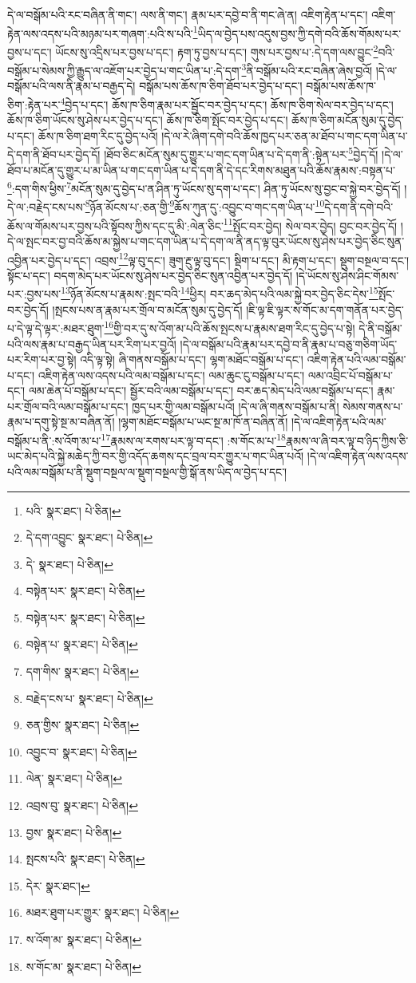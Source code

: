 དེ་ལ་བསྒོམ་པའི་རང་བཞིན་ནི་གང་། ལས་ནི་གང་། རྣམ་པར་དབྱེ་བ་ནི་གང་ཞེ་ན། འཇིག་རྟེན་པ་དང་། འཇིག་རྟེན་ལས་འདས་པའི་མཉམ་པར་གཞག་:པའི་ས་པའི་\footnote{པའི་  སྣར་ཐང་།  པེ་ཅིན། }ཡིད་ལ་བྱེད་པས་འདུས་བྱས་ཀྱི་དགེ་བའི་ཆོས་གོམས་པར་བྱས་པ་དང་། ཡོངས་སུ་འདྲིས་པར་བྱས་པ་དང་། རྟག་ཏུ་བྱས་པ་དང་། གུས་པར་བྱས་པ་:དེ་དག་ལས་བྱུང་\footnote{དེ་དག་འབྱུང་  སྣར་ཐང་།  པེ་ཅིན། }བའི་བསྒོམ་པ་སེམས་ཀྱི་རྒྱུད་ལ་འཇོག་པར་བྱེད་པ་གང་ཡིན་པ་:དེ་དག་\footnote{དེ་  སྣར་ཐང་།  པེ་ཅིན། }ནི་བསྒོམ་པའི་རང་བཞིན་ཞེས་བྱའོ། །དེ་ལ་བསྒོམ་པའི་ལས་ནི་རྣམ་པ་བརྒྱད་དེ། བསྒོམ་པས་ཆོས་ཁ་ཅིག་ཐོབ་པར་བྱེད་པ་དང་། བསྒོམ་པས་ཆོས་ཁ་ཅིག་:རྟེན་པར་\footnote{བསྟེན་པར་  སྣར་ཐང་།  པེ་ཅིན། }བྱེད་པ་དང་། ཆོས་ཁ་ཅིག་རྣམ་པར་སྦྱོང་བར་བྱེད་པ་དང་། ཆོས་ཁ་ཅིག་སེལ་བར་བྱེད་པ་དང་། ཆོས་ཁ་ཅིག་ཡོངས་སུ་ཤེས་པར་བྱེད་པ་དང་། ཆོས་ཁ་ཅིག་སྤོང་བར་བྱེད་པ་དང་། ཆོས་ཁ་ཅིག་མངོན་སུམ་དུ་བྱེད་པ་དང་། ཆོས་ཁ་ཅིག་ཐག་རིང་དུ་བྱེད་པའོ། །དེ་ལ་རེ་ཞིག་དགེ་བའི་ཆོས་ཁྱད་པར་ཅན་མ་ཐོབ་པ་གང་དག་ཡིན་པ་དེ་དག་ནི་ཐོབ་པར་བྱེད་དོ། །ཐོབ་ཅིང་མངོན་སུམ་དུ་གྱུར་པ་གང་དག་ཡིན་པ་དེ་དག་ནི་:སྟེན་པར་\footnote{བསྟེན་པར་  སྣར་ཐང་།  པེ་ཅིན། }བྱེད་དོ། །དེ་ལ་ཐོབ་པ་མངོན་དུ་གྱུར་པ་མ་ཡིན་པ་གང་དག་ཡིན་པ་དེ་དག་ནི་དེ་དང་རིགས་མཐུན་པའི་ཆོས་རྣམས་:བསྟན་པ་\footnote{བསྟེན་པ་  སྣར་ཐང་།  པེ་ཅིན། }:དག་གིས་ཕྱིས་\footnote{དག་གིས་  སྣར་ཐང་།  པེ་ཅིན། }མངོན་སུམ་དུ་བྱེད་པ་ན་ཤིན་ཏུ་ཡོངས་སུ་དག་པ་དང་། ཤིན་ཏུ་ཡོངས་སུ་བྱང་བ་སྐྱེ་བར་བྱེད་དོ། །དེ་ལ་:བརྗེད་ངས་པས་\footnote{བརྗེད་ངས་པ་  སྣར་ཐང་།  པེ་ཅིན། }ཉོན་མོངས་པ་:ཅན་གྱི་\footnote{ཅན་གྱིས་  སྣར་ཐང་།  པེ་ཅིན། }ཆོས་ཀུན་དུ་:འབྱུང་བ་གང་དག་ཡིན་པ་\footnote{འབྱུང་བ་  སྣར་ཐང་།  པེ་ཅིན། }དེ་དག་ནི་དགེ་བའི་ཆོས་ལ་གོམས་པར་བྱས་པའི་སྟོབས་ཀྱིས་དང་དུ་མི་:ལེན་ཅིང་\footnote{ལེན་  སྣར་ཐང་།  པེ་ཅིན། }སྤོང་བར་བྱེད། སེལ་བར་བྱེད། བྱང་བར་བྱེད་དོ། །དེ་ལ་སྤང་བར་བྱ་བའི་ཆོས་མ་སྐྱེས་པ་གང་དག་ཡིན་པ་དེ་དག་ལ་ནི་ནད་ལྟ་བུར་ཡོངས་སུ་ཤེས་པར་བྱེད་ཅིང་སུན་འབྱིན་པར་བྱེད་པ་དང་། འབྲས་\footnote{འབྲས་བུ་  སྣར་ཐང་།  པེ་ཅིན། }ལྟ་བུ་དང་། ཟུག་རྔུ་ལྟ་བུ་དང་། སྡིག་པ་དང་། མི་རྟག་པ་དང་། སྡུག་བསྔལ་བ་དང་། སྟོང་པ་དང་། བདག་མེད་པར་ཡོངས་སུ་ཤེས་པར་བྱེད་ཅིང་སུན་འབྱིན་པར་བྱེད་དོ། །དེ་ཡོངས་སུ་ཤེས་ཤིང་གོམས་པར་:བྱས་པས་\footnote{བྱས་  སྣར་ཐང་།  པེ་ཅིན། }ཉོན་མོངས་པ་རྣམས་:སྤང་བའི་\footnote{སྤངས་པའི་  སྣར་ཐང་།  པེ་ཅིན། }ཕྱིར། བར་ཆད་མེད་པའི་ལམ་སྐྱེ་བར་བྱེད་ཅིང་དེས་\footnote{དེར་  སྣར་ཐང་། }སྤོང་བར་བྱེད་དོ། །སྤངས་པས་ན་རྣམ་པར་གྲོལ་བ་མངོན་སུམ་དུ་བྱེད་དོ། །ཇི་ལྟ་ཇི་ལྟར་ས་གོང་མ་དག་གནོན་པར་བྱེད་པ་དེ་ལྟ་དེ་ལྟར་:མཐར་ཐུག་\footnote{མཐར་ཐུག་པར་གྱུར་  སྣར་ཐང་།  པེ་ཅིན། }གྱི་བར་དུ་ས་འོག་མ་པའི་ཆོས་སྤངས་པ་རྣམས་ཐག་རིང་དུ་བྱེད་པ་སྟེ། དེ་ནི་བསྒོམ་པའི་ལས་རྣམ་པ་བརྒྱད་ཡིན་པར་རིག་པར་བྱའོ། །དེ་ལ་བསྒོམ་པའི་རྣམ་པར་དབྱེ་བ་ནི་རྣམ་པ་བཅུ་གཅིག་ཡོད་པར་རིག་པར་བྱ་སྟེ། འདི་ལྟ་སྟེ། ཞི་གནས་བསྒོམ་པ་དང་། ལྷག་མཐོང་བསྒོམ་པ་དང་། འཇིག་རྟེན་པའི་ལམ་བསྒོམ་པ་དང་། འཇིག་རྟེན་ལས་འདས་པའི་ལམ་བསྒོམ་པ་དང་། ལམ་ཆུང་ངུ་བསྒོམ་པ་དང་། ལམ་འབྲིང་པོ་བསྒོམ་པ་དང་། ལམ་ཆེན་པོ་བསྒོམ་པ་དང་། སྦྱོར་བའི་ལམ་བསྒོམ་པ་དང་། བར་ཆད་མེད་པའི་ལམ་བསྒོམ་པ་དང་། རྣམ་པར་གྲོལ་བའི་ལམ་བསྒོམ་པ་དང་། ཁྱད་པར་གྱི་ལམ་བསྒོམ་པའོ། །དེ་ལ་ཞི་གནས་བསྒོམ་པ་ནི། སེམས་གནས་པ་རྣམ་པ་དགུ་སྟེ་སྔ་མ་བཞིན་ནོ། །ལྷག་མཐོང་བསྒོམ་པ་ཡང་སྔ་མ་ཁོ་ན་བཞིན་ནོ། །དེ་ལ་འཇིག་རྟེན་པའི་ལམ་བསྒོམ་པ་ནི་:ས་འོག་མ་པ་\footnote{ས་འོག་མ་  སྣར་ཐང་།  པེ་ཅིན། }རྣམས་ལ་རགས་པར་ལྟ་བ་དང་། :ས་གོང་མ་པ་\footnote{ས་གོང་མ་  སྣར་ཐང་།  པེ་ཅིན། }རྣམས་ལ་ཞི་བར་ལྟ་བ་ཉིད་ཀྱིས་ཅི་ཡང་མེད་པའི་སྐྱེ་མཆེད་ཀྱི་བར་གྱི་འདོད་ཆགས་དང་བྲལ་བར་གྱུར་པ་གང་ཡིན་པའོ། །དེ་ལ་འཇིག་རྟེན་ལས་འདས་པའི་ལམ་བསྒོམ་པ་ནི་སྡུག་བསྔལ་ལ་སྡུག་བསྔལ་གྱི་སྒོ་ནས་ཡིད་ལ་བྱེད་པ་དང་། 